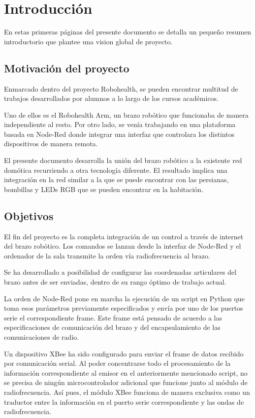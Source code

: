\chapter{Introducción}

En estas primeras páginas del presente documento se detalla un pequeño resumen introductorio que plantee una vision global de proyecto. 

\section{Motivación del proyecto}

Enmarcado dentro del proyecto Robohealth, se pueden encontrar multitud de trabajos desarrollados por alumnos a lo largo de los cursos académicos.

Uno de ellos es el Robohealth Arm, un brazo robótico que funcionaba de manera independiente al resto. Por otro lado, se venía trabajando en una plataforma basada en Node-Red donde integrar una interfaz que controlara los distintos dispositivos de manera remota.

El presente documento desarrolla la unión del brazo robótico a la existente red domótica recurriendo a otra tecnología diferente. El resultado implica una integración en la red similar a la que se puede encontrar con las persianas, bombillas y LEDs RGB que se pueden encontrar en la habitación.

\section{Objetivos}

El fin del proyecto es la completa integración de un control a través de internet del brazo robótico. Los comandos se lanzan desde la interfaz de Node-Red y el ordenador de la sala transmite la orden vía radiofrecuencia al brazo.

Se ha desarrollado a posibilidad de configurar las coordenadas articulares del brazo antes de ser enviadas, dentro de su rango óptimo de trabajo actual.

La orden de Node-Red pone en marcha la ejecución de un script en Python que toma esos parámetros previamente especificados y envía por uno de los puertos serie el correspondiente frame. Este frame está pensado de acuerdo a las especificaciones de comunicación del brazo y del encapsulamiento de las comunicaciones de radio.

Un dispositivo XBee ha sido configurado para enviar el frame de datos recibido por comunicación serial. Al poder concentrarse todo el procesamiento de la información correspondiente al emisor en el anteriormente mencionado script, no se precisa de ningún microcontrolador adicional que funcione junto al módulo de radiofrecuencia. Así pues, el módulo XBee funciona de manera exclusiva como un traductor entre la información en el puerto serie correspondiente y las ondas de radiofrecuencia.

